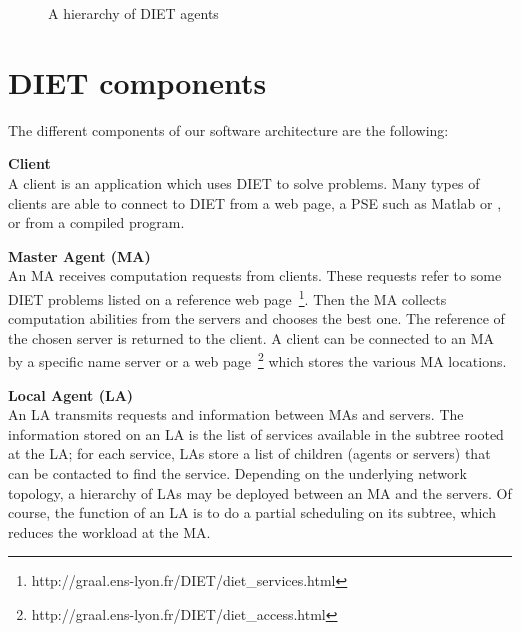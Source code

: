 \begin{figure}[htb]
 \begin{center}
  \caption{\label{fig:platform}A hierarchy of DIET agents}
 \end{center}
\end{figure}

\section{DIET components}
\label{sec:components}

The different components of our software architecture are the following:      

\begin{description}
\item \textbf{Client}\\
  A client is an application which uses DIET to solve problems.  Many
  types of clients are able to connect to DIET from a web page, a PSE
  such as Matlab or \sci, or from a compiled program.
\item \textbf{Master Agent (MA)}\\
  An MA receives computation requests from clients. These requests
  refer to some DIET problems listed on a reference web
  page~\footnote{http://graal.ens-lyon.fr/DIET/diet\_services.html}.
  Then the MA collects computation abilities from the servers and
  chooses the best one. The reference of the chosen server is returned
  to the client. A client can be connected to an MA by a specific name
  server or a web
  page~\footnote{http://graal.ens-lyon.fr/DIET/diet\_access.html}
  which stores the various MA locations.

\item \textbf{Local Agent (LA)}\\
  An LA transmits requests and information between MAs and servers.
  The information stored on an LA is the list of services available
  in the subtree rooted at the LA; for each service, LAs store a
  list of children (agents or servers) that can be contacted to find
  the service. Depending on the underlying
  network topology, a hierarchy of LAs may be deployed between an MA
  and the servers. Of course, the function of an LA is to do a partial
  scheduling on its subtree, which reduces the workload at the MA.


\end{description}
